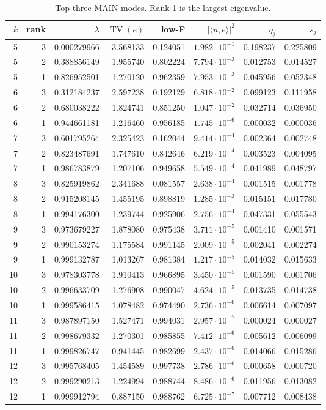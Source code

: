 \documentclass[11pt]{article}
\theoremstyle{remark}
\newcommand{\TV}{\operatorname{TV}}
\begin{document}
\begin{table}[ht]
\centering
\caption{Top-three MAIN modes.  Rank 1 is the largest eigenvalue.}
\label{tab:anatomy}
\scriptsize
\begin{tabular}{@{}rrrrrrrr@{}}
\toprule
$k$&rank&$\lambda$&$\TV(e)$&low-F&$|\langle u,e\rangle|^2$&$q_j$&$s_j$\\
\midrule
5&3&0.000279966&3.568133&0.124051&$1.982{\cdot}10^{-1}$&0.198237&0.225809\\
5&2&0.388856149&1.955740&0.802224&$7.794{\cdot}10^{-3}$&0.012753&0.014527\\
5&1&0.826952501&1.270120&0.962359&$7.953{\cdot}10^{-3}$&0.045956&0.052348\\
6&3&0.312184237&2.597238&0.192129&$6.818{\cdot}10^{-2}$&0.099123&0.111958\\
6&2&0.680038222&1.824741&0.851250&$1.047{\cdot}10^{-2}$&0.032714&0.036950\\
6&1&0.944661181&1.216460&0.956185&$1.745{\cdot}10^{-6}$&0.000032&0.000036\\
7&3&0.601795264&2.325423&0.162044&$9.414{\cdot}10^{-4}$&0.002364&0.002748\\
7&2&0.823487691&1.747610&0.842646&$6.219{\cdot}10^{-4}$&0.003523&0.004095\\
7&1&0.986783879&1.207106&0.949658&$5.549{\cdot}10^{-4}$&0.041989&0.048797\\
8&3&0.825919862&2.341688&0.081557&$2.638{\cdot}10^{-4}$&0.001515&0.001778\\
8&2&0.915208145&1.455195&0.898819&$1.285{\cdot}10^{-3}$&0.015151&0.017780\\
8&1&0.994176300&1.239744&0.925906&$2.756{\cdot}10^{-4}$&0.047331&0.055543\\
9&3&0.973679227&1.878080&0.975438&$3.711{\cdot}10^{-5}$&0.001410&0.001571\\
9&2&0.990153274&1.175584&0.991145&$2.009{\cdot}10^{-5}$&0.002041&0.002274\\
9&1&0.999132787&1.013267&0.981384&$1.217{\cdot}10^{-5}$&0.014032&0.015633\\
10&3&0.978303778&1.910413&0.966895&$3.450{\cdot}10^{-5}$&0.001590&0.001706\\
10&2&0.996633709&1.276908&0.990047&$4.624{\cdot}10^{-5}$&0.013735&0.014738\\
10&1&0.999586415&1.078482&0.974490&$2.736{\cdot}10^{-6}$&0.006614&0.007097\\
11&3&0.987897150&1.527471&0.994031&$2.957{\cdot}10^{-7}$&0.000024&0.000027\\
11&2&0.998679332&1.270301&0.985855&$7.412{\cdot}10^{-6}$&0.005612&0.006099\\
11&1&0.999826747&0.941445&0.982699&$2.437{\cdot}10^{-6}$&0.014066&0.015286\\
12&3&0.995768405&1.454589&0.997738&$2.786{\cdot}10^{-6}$&0.000658&0.000720\\
12&2&0.999290213&1.224994&0.988744&$8.486{\cdot}10^{-6}$&0.011956&0.013082\\
12&1&0.999912794&0.887150&0.988762&$6.725{\cdot}10^{-7}$&0.007712&0.008438\\
\bottomrule
\end{tabular}
\end{table}
\end{document}
